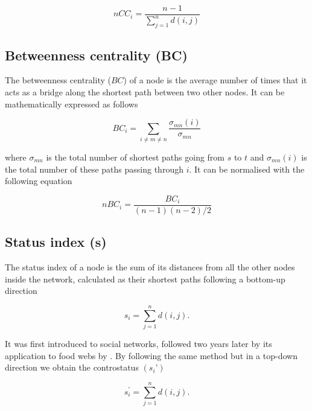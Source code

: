 \documentclass[twocolumn]{article}
\begin{document}
					\begin{equation}
								nCC_i=\frac{n-1}{\sum\limits_{j=1}^n d(i,j)}
					\end{equation}

	\subsection*{Betweenness centrality (BC)}

		The betweenness centrality ($BC$) of a node is the average number of times that it acts as a bridge along the shortest path between two other nodes. It can be  mathematically expressed as follows \citep{Wasserman1994}

						\begin{equation}
							BC_i=\sum_{i\neq m\neq n}\frac{\sigma_{mn}\left(i\right)}{\sigma_{mn}}
						\end{equation}

		\noindent where $\sigma_{mn}$ is the total number of shortest paths going from $s$ to $t$ and $\sigma_{mn}\left(i\right)$ is the total number of these paths passing through $i$. It can be normalised with the following equation \citep{Wasserman1994}

						\begin{equation}
							nBC_i=\frac{BC_i}{\left(n-1\right)\left(n-2\right)/2}
						\end{equation}

	\subsection*{Status index (s)}

		The status index of a node is the sum of its distances from all the other nodes inside the network, calculated as their shortest paths following a bottom-up direction \citep{Endredi2018}

						\begin{equation}
							s_i=\sum_{j=1}^{n}d\left(i,j\right).
						\end{equation}

		It was first introduced to social networks, followed two years later by its application to food webs by \citet{Harary1959, Harary1961}. By following the same method but in a top-down direction we obtain the controstatus $(s_i’)$

						\begin{equation}
							s_i^\prime=\sum_{j=1}^{n}d\left(i,j\right).
						\end{equation}
\end{document}
